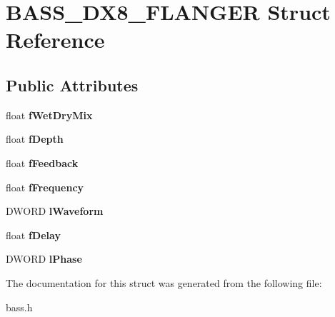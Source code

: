 \section{B\+A\+S\+S\+\_\+\+D\+X8\+\_\+\+F\+L\+A\+N\+G\+E\+R Struct Reference}
\label{struct_b_a_s_s___d_x8___f_l_a_n_g_e_r}
\subsection*{Public Attributes}
\begin{DoxyCompactItemize}
\item 
float {\bfseries f\+Wet\+Dry\+Mix}\label{struct_b_a_s_s___d_x8___f_l_a_n_g_e_r_ac538b83d3967c7f5658f05a020f86b1b}

\item 
float {\bfseries f\+Depth}\label{struct_b_a_s_s___d_x8___f_l_a_n_g_e_r_ad3e6b0734a3eca90563e76d660b41326}

\item 
float {\bfseries f\+Feedback}\label{struct_b_a_s_s___d_x8___f_l_a_n_g_e_r_ae28f1dfe21710942e12599ccc6e48ca7}

\item 
float {\bfseries f\+Frequency}\label{struct_b_a_s_s___d_x8___f_l_a_n_g_e_r_ab0bb5ca242d239183c4caa369b7575e7}

\item 
D\+W\+O\+R\+D {\bfseries l\+Waveform}\label{struct_b_a_s_s___d_x8___f_l_a_n_g_e_r_ae05f4fd19f4938bea9b178077f1c6ac5}

\item 
float {\bfseries f\+Delay}\label{struct_b_a_s_s___d_x8___f_l_a_n_g_e_r_a912410d445465d67601775f4cccdee4e}

\item 
D\+W\+O\+R\+D {\bfseries l\+Phase}\label{struct_b_a_s_s___d_x8___f_l_a_n_g_e_r_a2dd3286e5ffc91673f0f1594ad4d2b8a}

\end{DoxyCompactItemize}


The documentation for this struct was generated from the following file\+:\begin{DoxyCompactItemize}
\item 
bass.\+h\end{DoxyCompactItemize}
